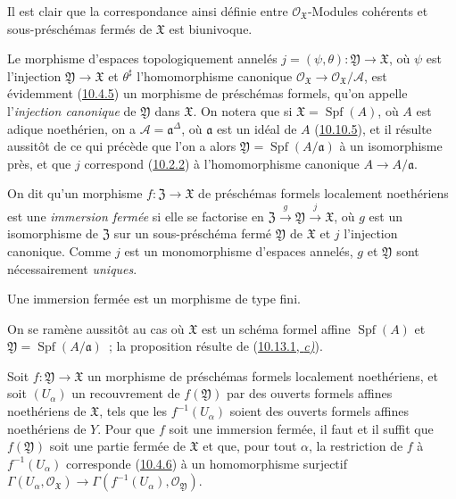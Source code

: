 Il est clair que la correspondance ainsi définie entre
$\mathscr{O}_{\mathfrak{X}}$-Modules cohérents et sous-préschémas fermés de
$\mathfrak{X}$ est biunivoque.

Le morphisme d'espaces topologiquement annelés
$j=(\psi,\theta):\mathfrak{Y}\to\mathfrak{X}$, où $\psi$ est l'injection
$\mathfrak{Y}\to\mathfrak{X}$ et $\theta^\sharp$ l'homomorphisme canonique
$\mathscr{O}_{\mathfrak{X}}\to\mathscr{O}_{\mathfrak{X}}/\mathscr{A}$, est
évidemment (\hyperref[I.10.4.5-fr]{10.4.5}) un morphisme de préschémas formels,
qu'on appelle l'\emph{injection canonique} de $\mathfrak{Y}$ dans $\mathfrak{X}$.
On notera que si $\mathfrak{X}=\operatorname{Spf}(A)$, où $A$ est adique
noethérien, on a $\mathscr{A}=\mathfrak{a}^\Delta$, où $\mathfrak{a}$ est un
idéal de $A$ (\hyperref[I.10.10.5-fr]{10.10.5}), et il résulte aussitôt de ce
qui précède que l'on a alors
$\mathfrak{Y}=\operatorname{Spf}(A/\mathfrak{a})$ à un isomorphisme près, et que
$j$ correspond (\hyperref[I.10.2.2-fr]{10.2.2}) à l'homomorphisme canonique
$A\to A/\mathfrak{a}$.

On dit qu'un morphisme $f:\mathfrak{Z}\to\mathfrak{X}$ de préschémas formels
localement noethériens est une \emph{immersion fermée} si elle se factorise en
$\mathfrak{Z}\xrightarrow{g}\mathfrak{Y}\xrightarrow{j}\mathfrak{X}$, où $g$
est un isomorphisme de $\mathfrak{Z}$ sur un sous-préschéma fermé
$\mathfrak{Y}$ de $\mathfrak{X}$ et $j$ l'injection canonique. Comme $j$ est un
monomorphisme d'espaces annelés, $g$ et $\mathfrak{Y}$ sont nécessairement
\emph{uniques}.

\begin{proposition}[10.14.3]
\label{I.10.14.3-fr}
Une immersion fermée est un morphisme de type fini.
\end{proposition}

On se ramène aussitôt au cas où $\mathfrak{X}$ est un schéma formel affine
$\operatorname{Spf}(A)$ et $\mathfrak{Y}=\operatorname{Spf}(A/\mathfrak{a})$~;
la proposition résulte de (\hyperref[I.10.13.1-fr]{10.13.1, \emph{c)}}).

\begin{lemma}[10.14.4]
\label{I.10.14.4-fr}
Soit $f:\mathfrak{Y}\to\mathfrak{X}$ un morphisme de préschémas formels
localement noethériens, et soit $(U_\alpha)$ un recouvrement de
$f(\mathfrak{Y})$ par des ouverts formels affines noethériens de
$\mathfrak{X}$, tels que les $f^{-1}(U_\alpha)$ soient des ouverts formels
affines noethériens de $Y$. Pour que $f$ soit une immersion fermée,
il faut et il suffit que $f(\mathfrak{Y})$ soit une partie fermée de
$\mathfrak{X}$ et que, pour tout $\alpha$, la restriction de $f$ à
$f^{-1}(U_\alpha)$ corresponde \textup{(\hyperref[I.10.4.6-fr]{10.4.6})} à un
homomorphisme surjectif
$\Gamma(U_\alpha,\mathscr{O}_{\mathfrak{X}})\to
\Gamma(f^{-1}(U_\alpha),\mathscr{O}_{\mathfrak{Y}})$.
\end{lemma}

